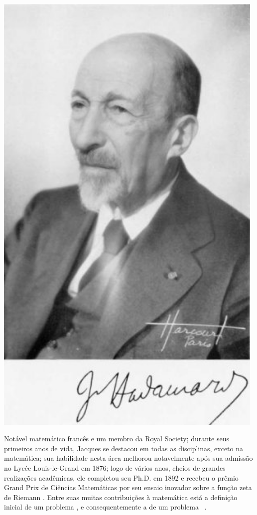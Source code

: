 \begin{elaboracion}[title=Jacques Salomon Hadamard (1865-1963), width= 0.99\linewidth]
\label{elab:Hadamard}
\noindent
\begin{minipage}{0.2\linewidth}
\centering
\includegraphics[width=0.98\textwidth]{chapters/notacao/Hadamard2.jpg}
\end{minipage}
\begin{minipage}{0.8\linewidth}
Notável matemático francês  e um membro da Royal Society;
durante seus primeiros anos de vida, 
Jacques se destacou em todas as disciplinas, exceto na matemática;
sua habilidade nesta área melhorou notavelmente após sua admissão no Lycée Louis-le-Grand em 1876;
logo de vários anos, cheios de  grandes realizações acadêmicas, ele completou seu Ph.D. em 1892 
e recebeu o prêmio Grand Prix de Ciências Matemáticas por seu ensaio inovador sobre a função zeta de Riemann
\cite[pp. 326]{agarwal2014creators}.
Entre suas muitas contribuições à matemática está a definição inicial de um problema \wellposed,
e consequentemente a de um problema \illposed~\cite[pp. 9, 132]{p2011well}.
\end{minipage}
\end{elaboracion}

